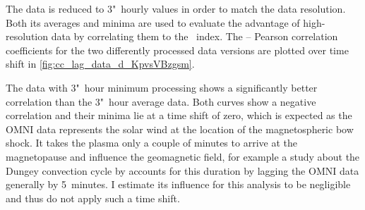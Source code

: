 The data is reduced to 3"~hourly values in order to match the \Kp{} data resolution. Both its averages and minima are used to evaluate the advantage of high-resolution data by correlating them to the \Kp~index. The \Kp{}--\vBz{} Pearson correlation coefficients for the two differently processed data versions are plotted over time shift in \autoref{fig:cc_lag_data_d_KpvsVBzgsm}.
\begin{figure}[htb]
	\begin{floatrow}
	\end{floatrow}
\end{figure}
\pagebreak
The data with 3"~hour minimum processing shows a significantly better correlation than the 3"~hour average data. Both curves show a negative correlation and their minima lie at a time shift of zero, which is expected as the OMNI data represents the solar wind at the location of the magnetospheric bow shock. It takes the plasma only a couple of minutes to arrive at the magnetopause and influence the geomagnetic field, for example a study about the Dungey convection cycle by \citet{Zhang2015} accounts for this duration by lagging the OMNI data generally by 5~minutes. I estimate its influence for this analysis to be negligible and thus do not apply such a time shift.

